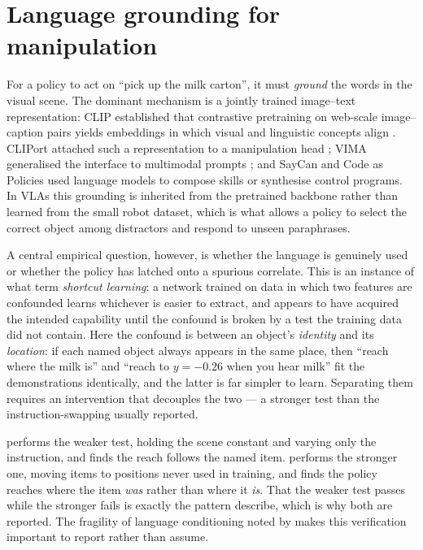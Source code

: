 \section{Language grounding for manipulation}
\label{sec:bg-lang}
For a policy to act on ``pick up the milk carton'', it must \emph{ground} the words
in the visual scene. The dominant mechanism is a jointly trained image--text
representation: CLIP established that contrastive pretraining on web-scale
image--caption pairs yields embeddings in which visual and linguistic concepts align
\parencite{radford2021clip}. CLIPort attached such a representation to a manipulation
head \parencite{shridhar2021cliport}; VIMA generalised the interface to multimodal
prompts \parencite{jiang2023vima}; and SayCan \parencite{ahn2022saycan} and Code as
Policies \parencite{liang2023codeaspolicies} used language models to compose skills or
synthesise control programs. In VLAs this grounding is inherited from the pretrained
backbone rather than learned from the small robot dataset, which is what allows a
policy to select the correct object among distractors and respond to unseen paraphrases.

A central empirical question, however, is whether the language is genuinely used or
whether the policy has latched onto a spurious correlate. This is an instance of what
\textcite{geirhos2020shortcut} term \emph{shortcut learning}: a network trained on data
in which two features are confounded learns whichever is easier to extract, and appears
to have acquired the intended capability until the confound is broken by a test the
training data did not contain. Here the confound is between an object's \emph{identity}
and its \emph{location}: if each named object always appears in the same place, then
``reach where the milk is'' and ``reach to $y=-0.26$ when you hear milk'' fit the
demonstrations identically, and the latter is far simpler to learn. Separating them
requires an intervention that decouples the two --- a stronger test than the
instruction-swapping usually reported.

 performs the weaker test, holding the scene constant and
varying only the instruction, and finds the reach follows the named item.
 performs the stronger one, moving items to positions never
used in training, and finds the policy reaches where the item \emph{was} rather than
where it \emph{is}. That the weaker test passes while the stronger fails is exactly the
pattern \textcite{geirhos2020shortcut} describe, which is why both are reported. The
fragility of language conditioning noted by \textcite{kiviranta2025smolvla} makes this
verification important to report rather than assume.

